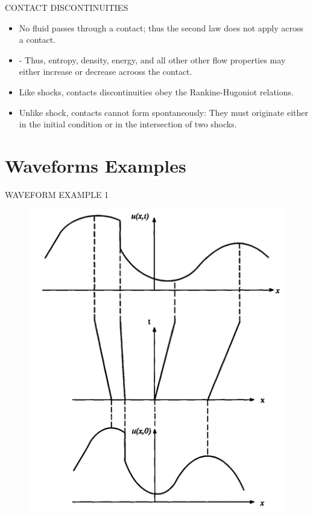 \documentclass{beamer}
\begin{document}
\begin{frame}{CONTACT DISCONTINUITIES}
  \begin{itemize}
   \item No fluid passes through a contact; thus the second law does not apply across a contact.
    \item  - Thus, entropy, density, energy, and all other other flow properties may either increase or decrease acrooss the contact.
    \item Like shocks, contacts discontinuities obey the Rankine-Hugoniot relations. 
    \item Unlike shock, contacts cannot form spontaneously: They must originate either in the initial condition or in the intersection of two shocks.
  \end{itemize}
\end{frame}

\section*{Waveforms Examples}

\begin{frame}{WAVEFORM EXAMPLE 1}
  \begin{figure}
   \includegraphics[scale=0.20]{figures/Preservation.jpg}
  \end{figure}
\end{frame}
\end{document}
